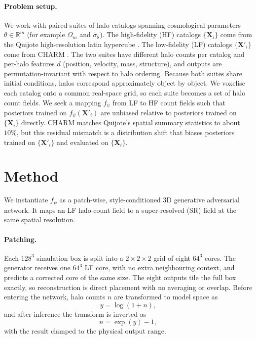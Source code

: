 \documentclass{article} %
\begin{document}
\paragraph{Problem setup.}
We work with paired suites of halo catalogs spanning cosmological parameters
$\theta \in \mathbb{R}^m$ (for example $\Omega_m$ and $\sigma_8$). The high-fidelity
(HF) catalogs $\{\mathbf{X}_i\}$ come from the Quijote high-resolution latin
hypercube \cite{villaescusa2020quijote}. The low-fidelity (LF) catalogs
$\{\mathbf{X}'_i\}$ come from CHARM \cite{pandey2025creating}. The two suites have
different halo counts per catalog and per-halo features $d$ (position, velocity,
mass, structure), and outputs are permutation-invariant with respect to halo
ordering. Because both suites share initial conditions, halos correspond
approximately object by object. We voxelise each catalog onto a common real-space
grid, so each suite becomes a set of halo count fields. We seek a mapping $f_\psi$
from LF to HF count fields such that posteriors trained on $f_\psi(\mathbf{X}'_i)$
are unbiased relative to posteriors trained on $\{\mathbf{X}_i\}$ directly. CHARM
matches Quijote's spatial summary statistics to about $10\%$, but this residual
mismatch is a distribution shift that biases posteriors trained on
$\{\mathbf{X}'_i\}$ and evaluated on $\{\mathbf{X}_i\}$.

\section{Method}

We instantiate $f_\psi$ as a patch-wise, style-conditioned 3D generative
adversarial network. It maps an LF halo-count field to a super-resolved (SR) field
at the same spatial resolution.

\paragraph{Patching.}
Each $128^3$ simulation box is split into a $2\times2\times2$ grid of eight $64^3$
cores. The generator receives one $64^3$ LF core, with no extra neighbouring
context, and predicts a corrected core of the same size. The eight outputs tile the
full box exactly, so reconstruction is direct placement with no averaging or
overlap. Before entering the network, halo counts $n$ are transformed to model space
as
\[
    y = \log(1+n),
\]
and after inference the transform is inverted as
\[
    n = \exp(y)-1,
\]
with the result clamped to the physical output range.
\end{document}

